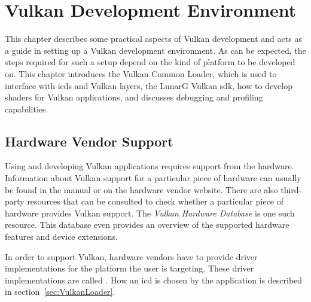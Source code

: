 
\chapter{Vulkan Development Environment}
\label{cha:EnvSetup}




  This chapter describes some practical aspects of Vulkan development and acts as a guide in setting up a Vulkan development environment.
  As can be expected, the steps required for such a setup depend on the kind of platform to be developed on.
  This chapter introduces the Vulkan Common Loader, which is used to interface with \glspl{icd} and Vulkan layers, the LunarG Vulkan \gls{sdk}, how to develop shaders for Vulkan applications, and discusses debugging and profiling capabilities.

  \section{Hardware Vendor Support}
  \label{sec:HardwareVendorSupport}
    Using and developing Vulkan applications requires support from the hardware.
    Information about Vulkan support for a particular piece of hardware can usually be found in the manual or on the hardware vendor website.
    There are also third-party resources that can be consulted to check whether a particular piece of hardware provides Vulkan support.
    The \textit{Vulkan Hardware Database}\cite{vulkangpuinfo} is one such resource.
    This database even provides an overview of the supported hardware features and device extensions.

    In order to support Vulkan, hardware vendors have to provide driver implementations for the platform the user is targeting.
    These driver implementations are called .
    How an \gls{icd} is chosen by the application is described in section~\ref{sec:VulkanLoader}.

